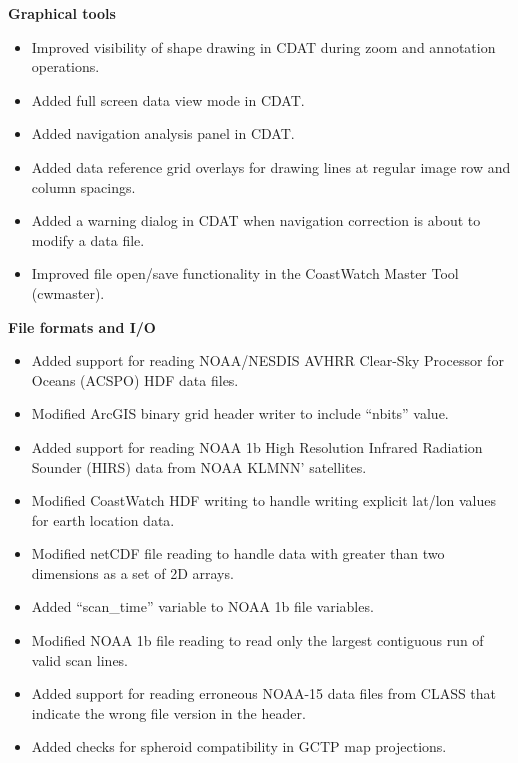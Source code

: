 \hspace{0.4cm} {\bf Graphical tools}

\begin{itemize}

  \item Improved visibility of shape drawing in CDAT during zoom and
  annotation operations.

  \item Added full screen data view mode in CDAT.

  \item Added navigation analysis panel in CDAT.

  \item Added data reference grid overlays for drawing lines at
  regular image row and column spacings.

  \item Added a warning dialog in CDAT when navigation correction is
  about to modify a data file.

  \item Improved file open/save functionality in the CoastWatch Master
  Tool (cwmaster).

\end{itemize}

\hspace{0.4cm} {\bf File formats and I/O}

\begin{itemize}

  \item Added support for reading NOAA/NESDIS AVHRR Clear-Sky
  Processor for Oceans (ACSPO) HDF data files.

  \item Modified ArcGIS binary grid header writer to include ``nbits''
  value.

  \item Added support for reading NOAA 1b High Resolution Infrared
  Radiation Sounder (HIRS) data from NOAA KLMNN' satellites.

  \item Modified CoastWatch HDF writing to handle writing explicit
  lat/lon values for earth location data.

  \item Modified netCDF file reading to handle data with greater than
  two dimensions as a set of 2D arrays.

  \item Added ``scan\_time'' variable to NOAA 1b file variables.

  \item Modified NOAA 1b file reading to read only the largest
  contiguous run of valid scan lines.

  \item Added support for reading erroneous NOAA-15 data files from
  CLASS that indicate the wrong file version in the header.

  \item Added checks for spheroid compatibility in GCTP map
  projections.

\end{itemize}

